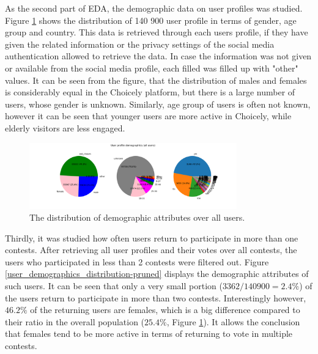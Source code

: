 As the second part of EDA, the demographic data on user profiles was studied. Figure \ref{user_demographics_distribution} shows the distribution of 140 900 user profile in terms of gender, age group and country. This data is retrieved through each users profile, if they have given the related information or the privacy settings of the social media authentication allowed to retrieve the data. In case the information was not given or available from the social media profile, each filled was filled up with "other" values. It can be seen from the figure, that the distribution of males and females is considerably equal in the Choicely platform, but there is a large number of users, whose gender is unknown. Similarly, age group of users is often not known, however it can be seen that younger users are more active in Choicely, while elderly visitors are less engaged. 

\begin{figure}[h] 
    \begin{center}
        \includegraphics[width=0.8\textwidth]{Images/user_demographics_distribution.png}
        \caption{The distribution of demographic attributes over all users.}
        \label{user_demographics_distribution}
    \end{center}
\end{figure}

Thirdly, it was studied how often users return to participate in more than one contests. After retrieving all user profiles and their votes over all contests, the users who participated in less than 2 contests were filtered out. Figure \ref{user_demographics_distribution-pruned} displays the demographic attributes of such users. It can be seen that only a very small portion ($3362 / 140900 = 2.4 \% $) of the users return to participate in more than two contests. Interestingly however, $46.2 \%$ of the returning users are females, which is a big difference compared to their ratio in the overall population ($25.4 \% $, Figure \ref{user_demographics_distribution}). It allows the conclusion that females tend to be more active in terms of returning to vote in multiple contests. 

